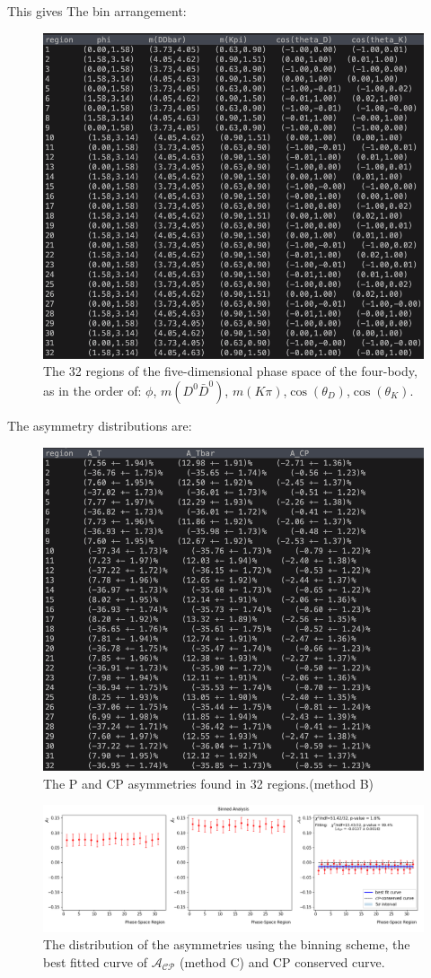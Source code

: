 \\
\\
This gives The bin arrangement:
\begin{figure}[h]
\center
\includegraphics*[width=0.76\linewidth]{binnedanalysis/phase_space_region1}
\caption{The 32 regions of the five-dimensional phase space of the four-body, as in the order of: $\phi$, $m(D^0\bar{D}^0)$, $m(K\pi)$,$\cos(\theta_D)$,$\cos(\theta_K)$.}
\label{phase_space1}
\end{figure}
\clearpage
The asymmetry distributions are:
\begin{figure}[h]
\center
\includegraphics*[width=0.76\linewidth]{binnedanalysis/phase_space_region_asy1}
\caption{The P and CP asymmetries found in 32 regions.(method B)}
\label{phase_space1}
\end{figure}
\begin{figure}[h]
\center
\includegraphics*[width=0.86\linewidth]{binnedanalysis/Binned_Analysis_factorspd_1E0.0_100000_1}
\caption{The distribution of the asymmetries using the binning scheme, the best fitted curve of $\mathcal{A}_{\mathcal{C}\mathcal{P}}$ (method C) and CP conserved curve.}
\label{binning1}
\end{figure}
